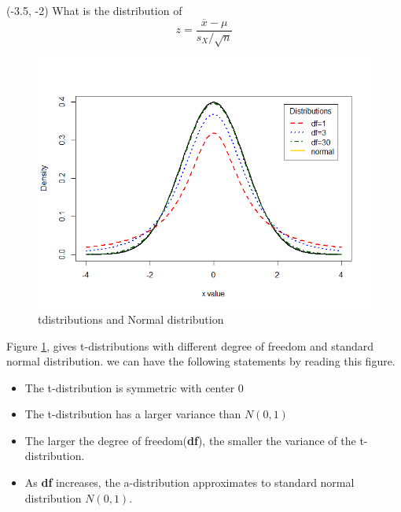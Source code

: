 \documentclass[a4paper, 12pt,twoside]{book}
\begin{document}
\begin{enumerate}[(1)]
    \begin{textblock}{3.5}(-3.5, -2)
    What is the distribution of $$z = \frac{\overline{x}-\mu}{s_X/\sqrt{n}}$$
    \end{textblock}

    \begin{figure}[H]
        \centering
        \includegraphics[scale=0.6]{TDdistributionsNormalDistribution}
        \caption{t\textendash distributions and Normal distribution}
        \label{TDdistributionsNormalDistribution}
    \end{figure}
 Figure \ref{TDdistributionsNormalDistribution}, gives t-distributions with different degree of freedom and standard normal distribution.  we can have the following statements by reading this figure.
    \begin{itemize}
        \item The t-distribution is symmetric with center 0
        \item The t-distribution has a larger variance than $N(0, 1)$
        \item The larger the degree of freedom(\textbf{df}), the smaller the variance of the t-distribution.
        \item As \textbf{df} increases, the a-distribution approximates to standard normal distribution $N(0, 1).$ 
    \end{itemize}  
    \end{enumerate}  
    \newpage
    
\end{document}
